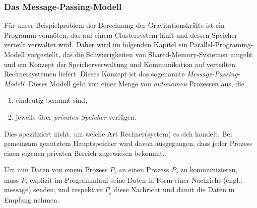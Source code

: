       \subsubsection{Das Message-Passing-Modell}
      \label{sec:mpm}
      Für unser Beispielproblem der Berechnung der Gravitationskräfte ist ein Programm vonnöten, das auf einem Clustersystem läuft und dessen Speicher verteilt verwaltet wird.
      Daher wird im folgenden Kapitel ein Parallel-Programing-Modell vorgestellt, das die Schwierigkeiten von Shared-Memory-Systemen umgeht und ein Konzept der Speicherverwaltung 
      und Kommunikation auf verteilten Rechnersystemen liefert.
      Dieses Konzept ist das sogenannte \textit{Message-Passing-Modell}. 
      Dieses Modell geht von einer Menge von \textit{autonomen} Prozessen aus, die
      \begin{enumerate}
       \item eindeutig benannt sind,
       \item jeweils über \textit{privaten Speicher} verfügen.
      \end{enumerate}
      Dies spezifiziert nicht, um welche Art Rechner(system) es sich handelt. Bei gemeinsam genutztem Hauptspeicher wird davon ausgegangen, dass jeder Prozess einen eigenen privaten 
      Bereich zugewiesen bekommt.
      
      Um nun Daten von einem Prozess $P_i$ an einen Prozess $P_j$ zu kommunizieren, muss $P_i$ explizit im Programmlauf seine Daten in Form einer Nachricht (engl.: message) senden, und
      respektive $P_j$ diese Nachricht und damit die Daten in Empfang nehmen. 
      
